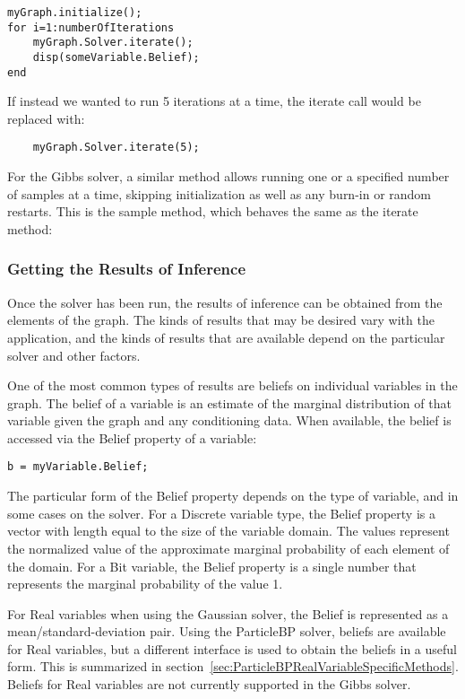 \begin{lstlisting}
myGraph.initialize();
for i=1:numberOfIterations
	myGraph.Solver.iterate();
	disp(someVariable.Belief);
end
\end{lstlisting}

If instead we wanted to run 5 iterations at a time, the iterate call would be replaced with:

\begin{lstlisting}
	myGraph.Solver.iterate(5);
\end{lstlisting}

For the Gibbs solver, a similar method allows running one or a specified number of samples at a time, skipping initialization as well as any burn-in or random restarts.  This is the sample method, which behaves the same as the iterate method:


\subsubsection{Getting the Results of Inference}

Once the solver has been run, the results of inference can be obtained from the elements of the graph.  The kinds of results that may be desired vary with the application, and the kinds of results that are available depend on the particular solver and other factors.

One of the most common types of results are beliefs on individual variables in the graph.  The belief of a variable is an estimate of the marginal distribution of that variable given the graph and any conditioning data.  When available, the belief is accessed via the Belief property of a variable:

\begin{lstlisting}
b = myVariable.Belief;
\end{lstlisting}

The particular form of the Belief property depends on the type of variable, and in some cases on the solver.  For a Discrete variable type, the Belief property is a vector with length equal to the size of the variable domain.  The values represent the normalized value of the approximate marginal probability of each element of the domain.  For a Bit variable, the Belief property is a single number that represents the marginal probability of the value 1.

For Real variables when using the Gaussian solver, the Belief is represented as a mean/standard-deviation pair.  Using the ParticleBP solver, beliefs are available for Real variables, but a different interface is used to obtain the beliefs in a useful form.  This is summarized in section~\ref{sec:ParticleBPRealVariableSpecificMethods}.  Beliefs for Real variables are not currently supported in the Gibbs solver.

